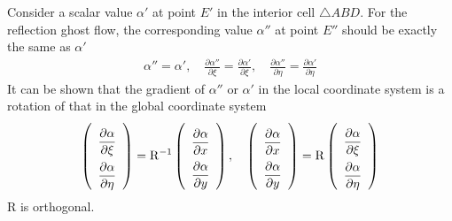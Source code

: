 \documentclass[a4paper,12pt,dvips]{article}
\begin{document}
Consider a scalar value $\alpha'$ at point $E'$ in the interior cell
$\bigtriangleup ABD$.  For the reflection ghost flow, the corresponding value
$\alpha''$ at point $E''$ should be exactly the same as $\alpha'$
\begin{align}
\alpha'' = \alpha', \quad
\frac{\partial\alpha''}{\partial\xi} = \frac{\partial\alpha'}{\partial\xi},
\quad
\frac{\partial\alpha''}{\partial\eta} = \frac{\partial\alpha'}{\partial\eta}
\label{e:reflection_sca}
\end{align}
It can be shown that the gradient of $\alpha''$ or $\alpha'$ in the local
coordinate system is a rotation of that in the global coordinate system
\begin{align}
\renewcommand{\arraystretch}{2.2}
\left(\begin{array}{c}
  \dfrac{\partial\alpha}{\partial\xi} \\ 
  \dfrac{\partial\alpha}{\partial\eta}
\end{array}\right) = \mathrm{R}^{-1}
\left(\begin{array}{c}
  \dfrac{\partial\alpha}{\partial x} \\ 
  \dfrac{\partial\alpha}{\partial y}
\end{array}\right), \quad
\renewcommand{\arraystretch}{2.2}
\left(\begin{array}{c}
  \dfrac{\partial\alpha}{\partial x} \\ 
  \dfrac{\partial\alpha}{\partial y}
\end{array}\right) = \mathrm{R}
\left(\begin{array}{c}
  \dfrac{\partial\alpha}{\partial\xi} \\ 
  \dfrac{\partial\alpha}{\partial\eta}
\end{array}\right) \label{e:reflection_sca_trans}
\end{align}
$\mathrm{R}$ is orthogonal.
\end{document}
